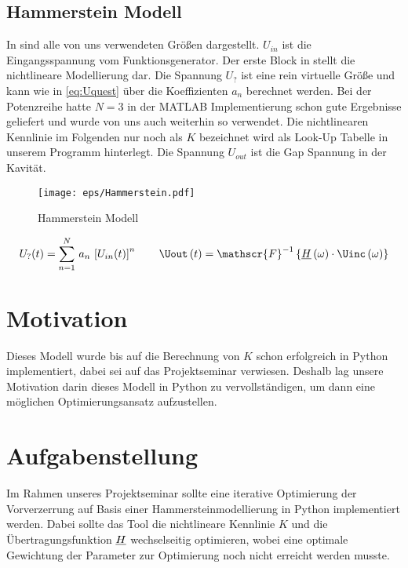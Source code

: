 \documentclass[../Report.tex]{subfiles}
\begin{document}
\subsection{Hammerstein Modell}
\label{subsec:einf.modell_BB.hammerstein}
In  sind alle von uns verwendeten Größen dargestellt. $U_{in}$ ist die Eingangsspannung vom Funktionsgenerator. Der erste Block in  stellt die nichtlineare Modellierung dar. Die Spannung $U_{?}$ ist eine rein virtuelle Größe und kann wie in \ref{eq:Uquest} über die Koeffizienten $a_n$ berechnet werden. Bei der Potenzreihe hatte $N = 3$ in der MATLAB Implementierung schon gute Ergebnisse geliefert und wurde von uns auch weiterhin so verwendet. Die nichtlinearen Kennlinie im Folgenden nur noch als $K$ bezeichnet wird als Look-Up Tabelle in unserem Programm hinterlegt. Die Spannung $U_{out}$ ist die Gap Spannung in der Kavität.
\begin{figure}[H]
	\centering
	\texttt{[image: eps/Hammerstein.pdf]}
	\caption{Hammerstein Modell}
  	\label{fig:Hammerstein}
\end{figure}
\begin{align}
	U_?(t)=\sum_{n=1}^N \, a_n \, \left[ U_{in}(t) \right]^n
	\label{eq:Uquest}
	\qquad
	\Uout \oft = \mathscr{F}^{-1} \left\{ \Hcompl \ofomega \cdot \Uinc \ofomega \right\}
\end{align}


\section{Motivation}
\label{sec:einf.motivation}
Dieses Modell wurde bis auf die Berechnung von $K$ schon erfolgreich in Python implementiert, dabei sei auf das Projektseminar \cite{PJS_Denys} verwiesen. Deshalb lag unsere Motivation darin dieses Modell in Python zu vervollständigen, um dann eine möglichen Optimierungsansatz aufzustellen.


\section{Aufgabenstellung}
\label{sec:einf.problem}
Im Rahmen unseres Projektseminar sollte eine iterative Optimierung der Vorverzerrung auf Basis einer Hammersteinmodellierung in Python implementiert werden. Dabei sollte das Tool die nichtlineare Kennlinie $K$ und die Übertragungsfunktion $\underline{H}$ wechselseitig optimieren, wobei eine optimale Gewichtung der Parameter zur Optimierung noch nicht erreicht werden musste.
\end{document}
